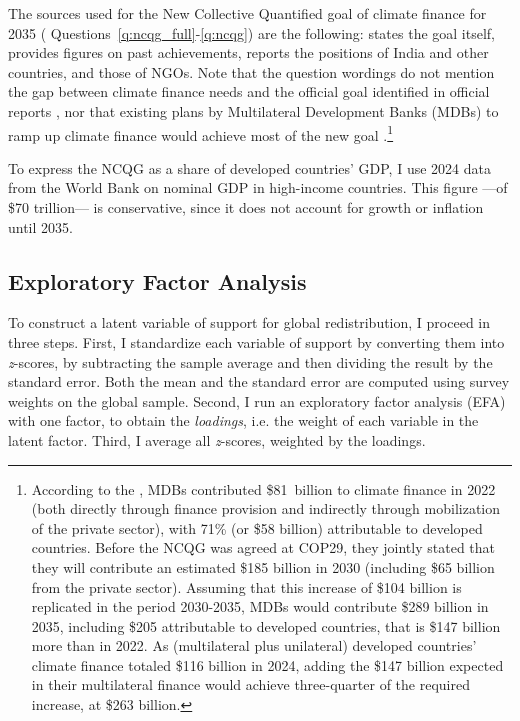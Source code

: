 \documentclass[12pt,english]{article}
\begin{document}
\begin{bibunit}
The sources used for the New Collective Quantified goal of climate finance for 2035 (%
Questions~\ref{q:ncqg_full}-\ref{q:ncqg}) are the following: \cite{unfccc_new_2024} states the goal itself, \cite{oecd_climate_2024} provides figures on past achievements, \cite{earth_negotiations_bulletin_daily_2024} reports the positions of India and other countries, and \cite{climate_action_network_climate_2024,demand_climate_justice_engo-demand_2025} those of NGOs. Note that the question wordings do not mention the gap between climate finance needs and the official goal identified in official reports \citep{oecd_bridging_2024,songwe_raising_2024}, nor that existing plans by Multilateral Development Banks (MDBs) to ramp up climate finance would achieve most of the new goal \citep{mdbs_joint_2024}.\footnote{According to the  \cite{oecd_climate_2024}, MDBs contributed \$81~billion to climate finance in 2022 (both directly through finance provision and indirectly through mobilization of the private sector), with 71\% (or \$58 billion) attributable to developed countries. Before the NCQG was agreed at COP29, they jointly stated that they will contribute an estimated \$185 billion in 2030 (including \$65 billion from the private sector). Assuming that this increase of \$104 billion is replicated in the period 2030-2035, MDBs would contribute \$289 billion in 2035, including \$205 attributable to developed countries, that is \$147 billion more than in 2022. As (multilateral plus unilateral) developed countries' climate finance totaled \$116 billion in 2024, adding the \$147 billion expected in their multilateral finance would achieve three-quarter of the required increase, at \$263 billion.}

To express the NCQG as a share of developed countries' GDP, I use 2024 data from the World Bank on nominal GDP in high-income countries. This figure ---of \$70 trillion--- is conservative, since it does not account for growth or inflation until 2035.

\subsection{Exploratory Factor Analysis}\label{subsec:efa}

To construct a latent variable of support for global redistribution, I proceed in three steps. First, I standardize each variable of support by converting them into \textit{z}-scores, by subtracting the sample average and then dividing the result by the standard error. Both the mean and the standard error are computed using survey weights on the global sample. 
Second, I run an exploratory factor analysis (EFA) with one factor, to obtain the \textit{loadings}, i.e. the weight of each variable in the latent factor. %
Third, I average all \textit{z}-scores, weighted by the loadings. 


\end{bibunit}
\end{document}

